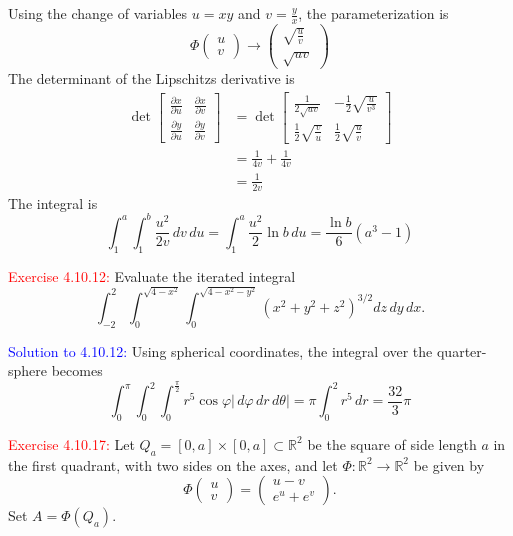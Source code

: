 \documentclass[12pt]{article}
\newcommand{\RR}{\mathbb{R}}
\newcommand{\pder}[2]{\frac{\partial #1}{\partial #2}}
\begin{document}
Using the change of variables $u = xy$ and $v = \frac{y}{x}$,
the parameterization is 
\[
    \Phi\begin{pmatrix} u \\ v\end{pmatrix} \to 
    \begin{pmatrix}
        \sqrt{\frac{u}{v}} \\ 
        \sqrt{uv}
    \end{pmatrix}
\]
The determinant of the Lipschitzs derivative is 
\begin{align*}
    \det 
    \begin{bmatrix}
        \pder{x}{u} & \pder{x}{v} \\ 
        \pder{y}{u} & \pder{y}{v}
    \end{bmatrix} 
    &= \det 
    \begin{bmatrix}
        \frac{1}{2\sqrt{uv}} &  -\frac{1}{2} \sqrt{\frac{u}{v^3}}\\ 
        \frac{1}{2}\sqrt{\frac{v}{u}} & \frac{1}{2}\sqrt{\frac{u}{v}}
    \end{bmatrix} \\
    &= \frac{1}{4v} + \frac{1}{4v} \\
    &= \frac{1}{2v}
\end{align*}
The integral is 
\[
    \int_1^a \int_1^b \frac{u^2}{2v} \,dv \,du
    = \int_1^a \frac{u^2}{2}\ln b \,du
    = \frac{\ln b}{6}(a^3-1)
\]
\newpage

\textcolor{red}{Exercise 4.10.12:}
Evaluate the iterated integral
\begin{equation*}
    \int_{-2}^2 \int_0^{\sqrt{4-x^2}} \int_0^{\sqrt{4-x^2-y^2}}
    (x^2 + y^2 +z^2)^{3/2} dz\,dy\,dx .
\end{equation*}


\textcolor{blue}{Solution to 4.10.12:}
Using spherical coordinates, the integral over the quarter-sphere becomes
\[
    \int_0^{\pi} \int_0^2 \int_0^{\frac{\pi}{2}}  
        r^5 \cos \varphi
        |\,d\varphi \,dr \,d\theta|
    = \pi \int_0^2 
        r^5
        \,dr 
    = \frac{32}{3}\pi
\]

\newpage

\textcolor{red}{Exercise 4.10.17:}
Let $Q_a=[0,a]\times [0,a]\subset \RR^2$ be the square of side length $a$ in the first quadrant, with two sides on the axes, and let $\Phi:\RR^2\to\RR^2$ be given by
\begin{equation*}
    \Phi \begin{pmatrix}
    u\\v
    \end{pmatrix} = \begin{pmatrix}
    u-v\\e^u+e^v
    \end{pmatrix} .
\end{equation*}
Set $A=\Phi(Q_a)$.
\end{document}
